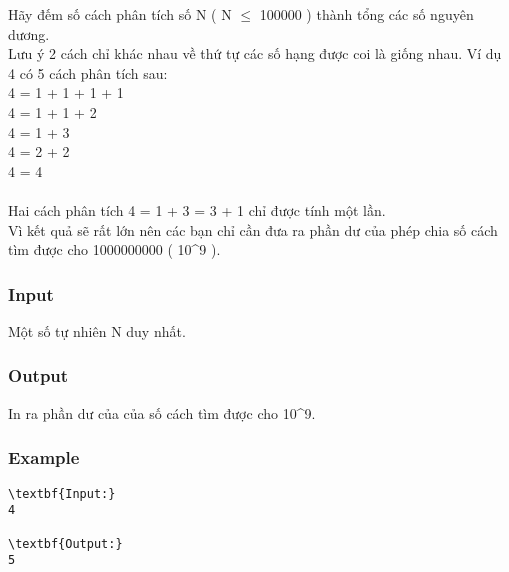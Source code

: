 



   Hãy đếm số cách phân tích số N ( N $\le$ 100000 ) thành tổng các số nguyên dương.   
\\   Lưu ý 2 cách chỉ khác nhau về thứ tự các số hạng được coi là giống nhau. Ví dụ 4 có 5 cách phân tích sau:   
\\   4 = 1 + 1 + 1 + 1   
\\   4 = 1 + 1 + 2   
\\   4 = 1 + 3   
\\   4 = 2 + 2   
\\   4 = 4   
\\
\\   Hai cách phân tích 4 = 1 + 3 = 3 + 1 chỉ được tính một lần.   
\\   Vì kết quả sẽ rất lớn nên các bạn chỉ cần đưa ra phần dư của phép chia số cách tìm được cho 1000000000 ( 10\textasciicircum9 ).  

\subsubsection{   Input  }

   Một số tự nhiên N duy nhất.  

\subsubsection{   Output  }

   In ra phần dư của của số cách tìm được cho 10\textasciicircum9.  

\subsubsection{   Example  }
\begin{verbatim}
\textbf{Input:}
4

\textbf{Output:}
5
\end{verbatim}
